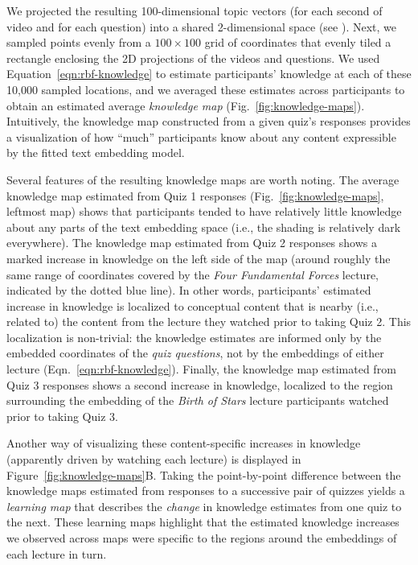 \documentclass[10pt]{article}
\renewcommand{\nameref}[1]{\mbox{\textit{\oldnameref{#1}}}}
\begin{document}
We projected the resulting 100-dimensional topic vectors (for each second of
video and for each question) into a shared 2-dimensional space (see
\nameref{subsec:knowledge-maps}). Next, we sampled
points evenly from a $100 \times 100$ grid of coordinates that evenly tiled a
rectangle enclosing the 2D projections of the videos and questions. We used
Equation~\ref{eqn:rbf-knowledge} to estimate participants' knowledge at each of
these 10,000 sampled locations, and we averaged these estimates across
participants to obtain an estimated average \textit{knowledge map}
(Fig.~\ref{fig:knowledge-maps}). Intuitively, the knowledge map constructed
from a given quiz's responses provides a visualization of how ``much''
participants know about any content expressible by the fitted text embedding
model.

Several features of the resulting knowledge maps are worth noting. The average
knowledge map estimated from Quiz 1 responses (Fig.~\ref{fig:knowledge-maps},
leftmost map) shows that participants tended to have relatively little
knowledge about any parts of the text embedding space (i.e., the shading is
relatively dark everywhere). The knowledge map estimated from Quiz 2 responses
shows a marked increase in knowledge on the left side of the map (around
roughly the same range of coordinates covered by the \textit{Four Fundamental
Forces} lecture, indicated by the dotted blue line). In other words,
participants' estimated increase in knowledge is localized to conceptual
content that is nearby (i.e., related to) the content from the lecture they
watched prior to taking Quiz 2. This localization is non-trivial: the knowledge
estimates are informed only by the embedded coordinates of the \textit{quiz
questions}, not by the embeddings of either lecture
(Eqn.~\ref{eqn:rbf-knowledge}). Finally, the knowledge map estimated from Quiz
3 responses shows a second increase in knowledge, localized to the region
surrounding the embedding of the \textit{Birth of Stars} lecture participants
watched prior to taking Quiz 3.

Another way of visualizing these content-specific increases in knowledge
(apparently driven by watching each lecture) is displayed in
Figure~\ref{fig:knowledge-maps}B. Taking the point-by-point difference between
the knowledge maps estimated from responses to a successive pair of quizzes
yields a \textit{learning map} that describes the \textit{change} in knowledge
estimates from one quiz to the next. These learning maps highlight that the
estimated knowledge increases we observed across maps were specific to the
regions around the embeddings of each lecture in turn.
\end{document}
